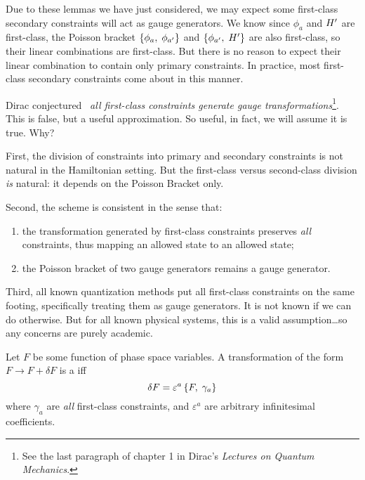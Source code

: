 Due to these lemmas we have just considered, we may expect some
first-class secondary constraints will act as gauge generators. We know
since $\phi_{a}$ and $H'$ are first-class, the
Poisson bracket $\left\{\phi_{a},\;\phi_{a'}\right\}$ and
$\left\{\phi_{a'},\;H'\right\}$ are also
first-class, so their linear combinations are first-class. But there is
no reason to expect their linear combination to contain only primary
constraints. In practice, most first-class secondary constraints come
about in this manner.

Dirac conjectured~\cite{dirac1964} \emph{all first-class constraints generate
gauge transformations}\footnote{See the last paragraph of chapter 1 in
  Dirac's \emph{Lectures on Quantum Mechanics}.}.
This is false, but a useful approximation. So useful, in fact, we will
assume it is true. Why?

First, the division of constraints into primary and secondary
constraints is not natural in the Hamiltonian setting. But the
first-class versus second-class division \emph{is} natural: it depends
on the Poisson Bracket only.

Second, the scheme is consistent in the sense that:
\begin{enumerate}
\item the transformation generated by first-class constraints preserves
  \emph{all} constraints, thus mapping an allowed state to an allowed
  state;
\item the Poisson bracket of two gauge generators remains a gauge
  generator.
\end{enumerate}

Third, all known quantization methods put all first-class constraints on
the same footing, specifically treating them as gauge generators. It is
not known if we can do otherwise. But for all known physical systems,
this is a valid assumption\dots so any concerns are purely academic.

\begin{definition}
Let $F$ be some function of phase space variables. A transformation of
the form $F\to F + \delta F$ is a  iff
\begin{equation}
\delta F = \varepsilon^{a}\left\{F,\;\gamma_{a}\right\}
\end{equation}
where $\gamma_{a}$ are \emph{all} first-class constraints, and
$\varepsilon^{a}$ are arbitrary infinitesimal coefficients.
\end{definition}

